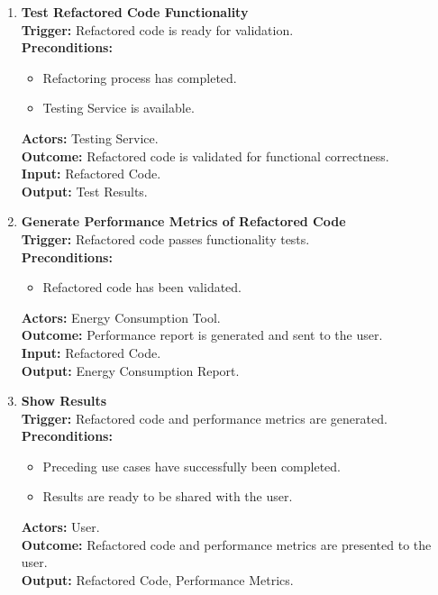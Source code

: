 \documentclass[12pt]{article}
\begin{document}
\begin{enumerate}[label={\bf PUC \arabic*:}, wide=0pt, font=\itshape]
\item \textbf{Test Refactored Code Functionality} \\[2mm]
\textbf{Trigger:} Refactored code is ready for validation. \\[2mm]
\textbf{Preconditions:}
\begin{itemize}
    \item Refactoring process has completed.
    \item Testing Service is available.
\end{itemize}
\textbf{Actors:} Testing Service. \\
\textbf{Outcome:} Refactored code is validated for functional correctness. \\
\textbf{Input:} Refactored Code. \\
\textbf{Output:} Test Results.

\item \textbf{Generate Performance Metrics of Refactored Code} \\[2mm]
\textbf{Trigger:} Refactored code passes functionality tests. \\[2mm]
\textbf{Preconditions:}
\begin{itemize}
    \item Refactored code has been validated.
\end{itemize}
\textbf{Actors:} Energy Consumption Tool. \\
\textbf{Outcome:} Performance report is generated and sent to the user. \\
\textbf{Input:} Refactored Code. \\
\textbf{Output:} Energy Consumption Report.

\item \textbf{Show Results} \\[2mm]
\textbf{Trigger:} Refactored code and performance metrics are generated. \\[2mm]
\textbf{Preconditions:}
\begin{itemize}
    \item Preceding use cases have successfully been completed.
    \item Results are ready to be shared with the user.
\end{itemize}
\textbf{Actors:} User. \\
\textbf{Outcome:} Refactored code and performance metrics are presented to the user. \\
\textbf{Output:} Refactored Code, Performance Metrics.

\end{enumerate}
\end{document}
